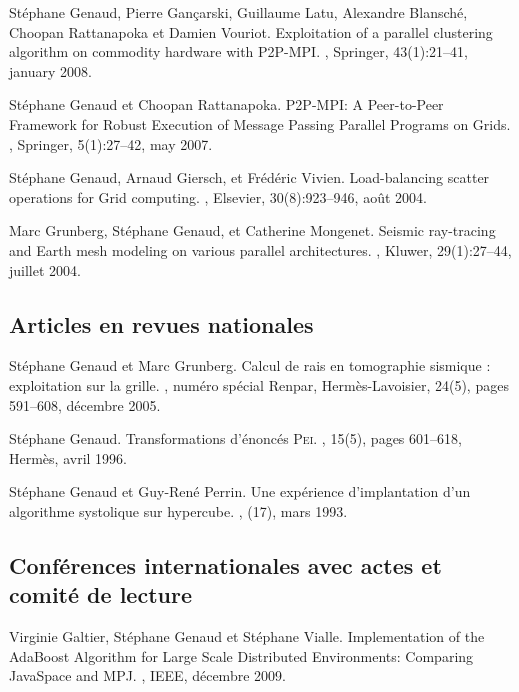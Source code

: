 \begin{thebibliography}{99}
Stéphane Genaud, Pierre Gançarski, Guillaume Latu, Alexandre Blansché, Choopan Rattanapoka et Damien Vouriot.
\newblock Exploitation of a parallel clustering algorithm on commodity hardware with P2P-MPI.
, Springer, 43(1):21--41, january 2008.


Stéphane Genaud et Choopan Rattanapoka.
\newblock P2P-MPI: A Peer-to-Peer Framework for Robust Execution of Message Passing Parallel Programs on Grids.
, Springer, 5(1):27--42, may 2007.


St\'{e}phane Genaud, Arnaud Giersch, et Fr\'{e}d\'{e}ric Vivien.
\newblock Load-balancing scatter operations for Grid computing.
, Elsevier, 30(8):923--946, août 2004.

Marc Grunberg, St\'{e}phane Genaud, et Catherine Mongenet.
\newblock Seismic ray-tracing and Earth mesh modeling on various parallel
  architectures.
, Kluwer, 29(1):27--44, juillet 2004.


\subsection*{Articles en revues nationales}
St\'{e}phane Genaud et Marc Grunberg. 
\newblock  Calcul de rais en tomographie sismique : exploitation sur la grille.
, numéro spécial Renpar, 
Herm\`{e}s-Lavoisier, 24(5), pages 591--608, décembre 2005.

St\'{e}phane Genaud.
\newblock Transformations d'\'{e}nonc\'{e}s \textsc{Pei}.
, 15(5), pages 601--618, Herm\`{e}s, avril 1996.

St\'{e}phane Genaud et Guy-Ren\'{e} Perrin.
\newblock Une exp\'{e}rience d'implantation d'un algorithme systolique sur
  hypercube.
,
  (17), mars 1993.


\subsection*{Conf\'{e}rences internationales avec actes et comité de lecture}

\newblock Virginie Galtier, Stéphane Genaud et Stéphane Vialle.
\newblock Implementation of the AdaBoost Algorithm for Large Scale Distributed Environments:%
Comparing JavaSpace and MPJ.
, IEEE, décembre 2009.



\end{thebibliography}

